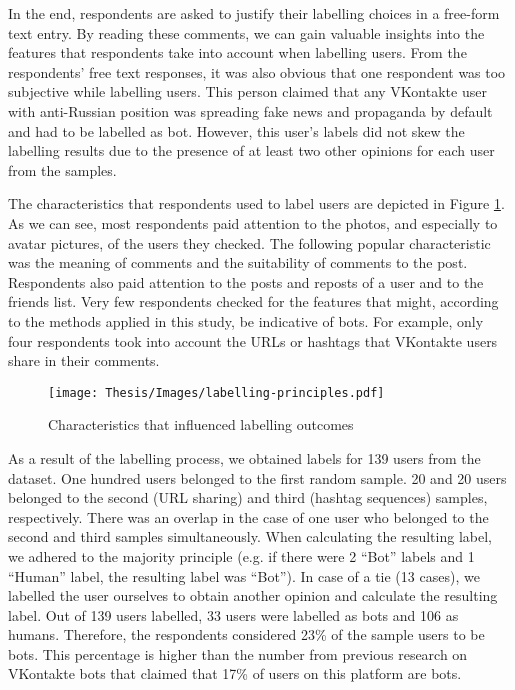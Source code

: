 In the end, respondents are asked to justify their labelling choices in a free-form text entry. By reading these comments, we can gain valuable insights into the features that respondents take into account when labelling users. From the respondents' free text responses, it was also obvious that one respondent was too subjective while labelling users. This person claimed that any VKontakte user with anti-Russian position was spreading fake news and propaganda by default and had to be labelled as bot. However, this user's labels did not skew the labelling results due to the presence of at least two other opinions for each user from the samples. 

The characteristics that respondents used to label users are depicted in Figure \ref{fig:labelling-principles}. As we can see, most respondents paid attention to the photos, and especially to avatar pictures, of the users they checked. The following popular characteristic was the meaning of comments and the suitability of comments to the post. Respondents also paid attention to the posts and reposts of a user and to the friends list. Very few respondents checked for the features that might, according to the methods applied in this study, be indicative of bots. For example, only four respondents took into account the URLs or hashtags that VKontakte users share in their comments. 

\begin{figure}
	\centering
	\texttt{[image: Thesis/Images/labelling-principles.pdf]}
	\caption{Characteristics that influenced labelling outcomes}
	\label{fig:labelling-principles}
\end{figure}

As a result of the labelling process, we obtained labels for 139 users from the dataset. One hundred users belonged to the first random sample. 20 and 20 users belonged to the second (URL sharing) and third (hashtag sequences) samples, respectively. There was an overlap in the case of one user who belonged to the second and third samples simultaneously. When calculating the resulting label, we adhered to the majority principle (e.g. if there were 2 ``Bot'' labels and 1 ``Human'' label, the resulting label was ``Bot''). In case of a tie (13 cases), we labelled the user ourselves to obtain another opinion and calculate the resulting label.  Out of 139 users labelled, 33 users were labelled as bots and 106 as humans. Therefore, the respondents considered 23\% of the sample users to be bots. This percentage is higher than the number from previous research on VKontakte bots that claimed that 17\% of users on this platform are bots\cite{vkBotPercentage}. 


